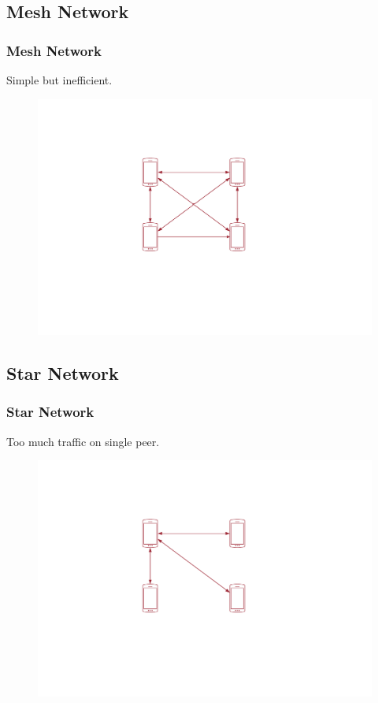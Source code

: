 \documentclass{beamer}
\begin{document}
\subsection{Mesh Network}
\begin{frame}
\frametitle{Mesh Network}
Simple but inefficient.
		\begin{figure}[h!]
			\centering
			\includegraphics[scale=0.6]{figs/mesh.pdf}
		\end{figure}
\end{frame}
\subsection{Star Network}
\begin{frame}
	\frametitle{Star Network}
	Too much traffic on single peer.
	\begin{figure}[h!]
		\centering
		\includegraphics[scale=0.6]{figs/star.pdf}
	\end{figure}
\end{frame}
\end{document}
